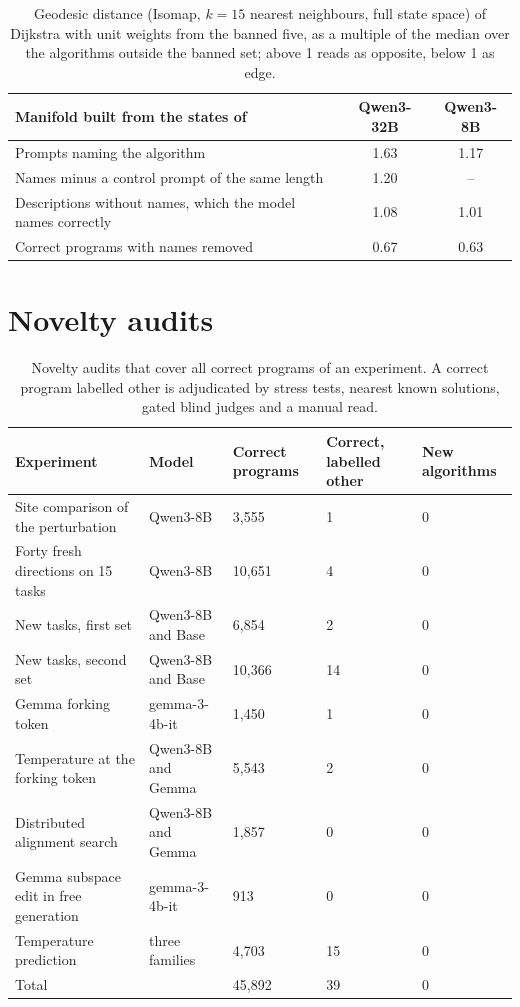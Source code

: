 \documentclass[11pt,letterpaper]{article}
\begin{document}
\begin{table}[!htbp]
\centering
\footnotesize
\caption{Geodesic distance (Isomap, $k = 15$ nearest neighbours, full state space) of Dijkstra with unit weights from the banned five, as a multiple of the median over the algorithms outside the banned set; above 1 reads as opposite, below 1 as edge.}
\label{tab:geodesic}
\begin{tabular}{@{}lcc@{}}
\toprule
Manifold built from the states of & Qwen3-32B & Qwen3-8B \\
\midrule
Prompts naming the algorithm & 1.63 & 1.17 \\
Names minus a control prompt of the same length & 1.20 & -- \\
Descriptions without names, which the model names correctly & 1.08 & 1.01 \\
Correct programs with names removed & 0.67 & 0.63 \\
\bottomrule
\end{tabular}
\end{table}

\section{Novelty audits}
\label{app:novelty}

\begin{table}[!htbp]
\centering
\footnotesize
\caption{Novelty audits that cover all correct programs of an experiment. A correct program labelled other is adjudicated by stress tests, nearest known solutions, gated blind judges and a manual read.}
\label{tab:novelty}
\begin{tabularx}{\linewidth}{@{}YL{2.9cm}L{1.8cm}L{2.2cm}L{1.6cm}@{}}
\toprule
Experiment & Model & Correct programs & Correct, labelled other & New algorithms \\
\midrule
Site comparison of the perturbation & Qwen3-8B & 3,555 & 1 & 0 \\
Forty fresh directions on 15 tasks & Qwen3-8B & 10,651 & 4 & 0 \\
New tasks, first set & Qwen3-8B and Base & 6,854 & 2 & 0 \\
New tasks, second set & Qwen3-8B and Base & 10,366 & 14 & 0 \\
Gemma forking token & gemma-3-4b-it & 1,450 & 1 & 0 \\
Temperature at the forking token & Qwen3-8B and Gemma & 5,543 & 2 & 0 \\
Distributed alignment search & Qwen3-8B and Gemma & 1,857 & 0 & 0 \\
Gemma subspace edit in free generation & gemma-3-4b-it & 913 & 0 & 0 \\
Temperature prediction & three families & 4,703 & 15 & 0 \\
\midrule
Total & & 45,892 & 39 & 0 \\
\bottomrule
\end{tabularx}
\end{table}
\end{document}
